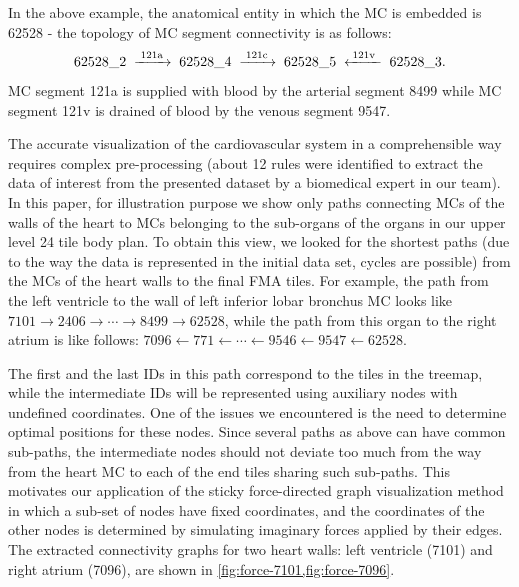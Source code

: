 In the above example, the anatomical entity in which the MC is embedded is 62528 - the topology of MC segment connectivity is as follows:
\[
	62528\_2  \;\xrightarrow{\;\text{121a}\;}\;
	62528\_4  \;\xrightarrow{\;\text{121c}\;}\;
	62528\_5  \;\xleftarrow {\;\text{121v}\;}\;
	62528\_3  \text.
\]
MC segment 121a is supplied with blood by the arterial segment 8499 while MC segment 121v is drained of blood by the venous segment 9547.

The accurate visualization of the cardiovascular system in a comprehensible way requires complex pre-processing (about 12 rules were identified to extract the data of interest from the presented dataset by a biomedical expert in our team).
In this paper, for illustration purpose we show only paths connecting MCs of the walls of the heart to MCs belonging to the sub-organs of the organs in our upper level 24 tile body plan.
To obtain this view, we looked for the shortest paths (due to the way the data is represented in the initial data set, cycles are possible) from the MCs of the heart walls to the final FMA tiles. For example, the path from the left ventricle to the wall of left inferior lobar bronchus MC looks like 
{$7101 \rightarrow 2406 \rightarrow \cdots \rightarrow 8499 \rightarrow 62528$,}
while the path from this organ to the right atrium is like follows: 
{$7096 \leftarrow 771 \leftarrow \cdots \leftarrow 9546 \leftarrow 9547 \leftarrow 62528$.}

The first and the last IDs in this path correspond to the tiles in the treemap, while the intermediate IDs will be represented using auxiliary nodes with undefined coordinates. One of the issues we encountered is the need to determine optimal positions for these nodes. Since several paths as above can have common sub-paths, the intermediate nodes should not deviate too much from the way from the heart MC to each of the end tiles sharing such sub-paths. This motivates our application of the sticky force-directed graph visualization method~\cite{FR91,Bos14} in which a sub-set of nodes have fixed coordinates, and the coordinates of the other nodes is determined by simulating imaginary forces applied by their edges.
The extracted connectivity graphs for two heart walls: left ventricle (7101) and right atrium (7096), are shown in \cref{fig:force-7101,fig:force-7096}.


